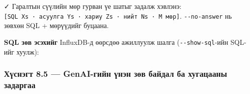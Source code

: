 ✓ Гаралтын сүүлийн мөр гурван үе шатыг задалж хэвлэнэ: \texttt{{[}SQL\ Xs\ ·\ асуулга\ Ys\ ·\ хариу\ Zs\ ·\ нийт\ Ns\ ·\ M\ мөр{]}}. \texttt{-\/-no-answer} нь зөвхөн SQL + мөрүүдийг буцаана.

\textbf{SQL зөв эсэхийг} InfluxDB-д өөрсдөө ажиллуулж шалга (\texttt{-\/-show-sql}-ийн SQL-ийг хуулж):

\begin{Shaded}
\begin{Highlighting}[]
 \KeywordTok{\textbackslash{}}
   \VariableTok{$(} \VariableTok{)} \KeywordTok{|} 
\end{Highlighting}
\end{Shaded}

\hypertarget{ux445ux4afux441ux43dux44dux433ux442-8.5-genai-ux433ux438ux439ux43d-ux4afux43dux44dux43d-ux437ux4e9ux432-ux431ux430ux439ux434ux430ux43b-ux431ux430-ux445ux443ux433ux430ux446ux430ux430ux43dux44b-ux437ux430ux434ux430ux440ux433ux430ux430}{%
\subsubsection{Хүснэгт 8.5 --- GenAI-гийн үнэн зөв байдал ба хугацааны задаргаа}\label{ux445ux4afux441ux43dux44dux433ux442-8.5-genai-ux433ux438ux439ux43d-ux4afux43dux44dux43d-ux437ux4e9ux432-ux431ux430ux439ux434ux430ux43b-ux431ux430-ux445ux443ux433ux430ux446ux430ux430ux43dux44b-ux437ux430ux434ux430ux440ux433ux430ux430}}

